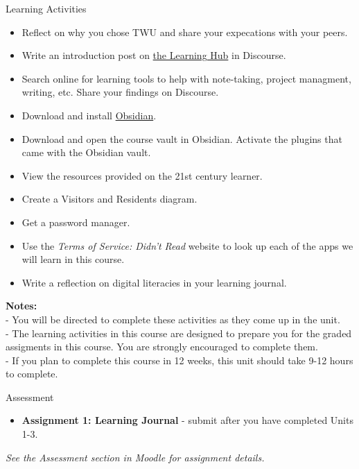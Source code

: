 \documentclass[
]{book}
\providecommand{\tightlist}{%
  \setlength{\itemsep}{0pt}\setlength{\parskip}{0pt}}
\theoremstyle{definition}
\theoremstyle{definition}
\theoremstyle{definition}
\theoremstyle{definition}
\theoremstyle{remark}
\begin{document}
\begin{reflect}
{Learning Activities}

\begin{itemize}
\tightlist
\item
  Reflect on why you chose TWU and share your expecations with your peers.
\item
  Write an introduction post on \href{https://twu.discourse.group}{the Learning Hub} in Discourse.\\
\item
  Search online for learning tools to help with note-taking, project managment, writing, etc. Share your findings on Discourse.
\item
  Download and install \href{https://obsidian.md}{Obsidian}.\\
\item
  Download and open the course vault in Obsidian. Activate the plugins that came with the Obsidian vault.\\
\item
  View the resources provided on the 21st century learner.
\item
  Create a Visitors and Residents diagram.\\
\item
  Get a password manager.\\
\item
  Use the \emph{Terms of Service: Didn't Read} website to look up each of the apps we will learn in this course.
\item
  Write a reflection on digital literacies in your learning journal.
\end{itemize}

\textbf{Notes:}\\
- You will be directed to complete these activities as they come up in the unit.\\
- The learning activities in this course are designed to prepare you for the graded assigments in this course. You are strongly encouraged to complete them.\\
- If you plan to complete this course in 12 weeks, this unit should take 9-12 hours to complete.
\end{reflect}

\begin{assessment}
{Assessment}

\begin{itemize}
\tightlist
\item
  \textbf{Assignment 1: Learning Journal} - submit after you have completed Units 1-3.
\end{itemize}

\emph{See the Assessment section in Moodle for assignment details.}
\end{assessment}
\end{document}
